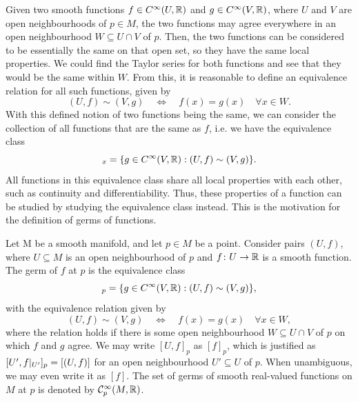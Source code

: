 \documentclass[a4paper,12pt]{article}
\begin{document}
Given two smooth functions $f \in C^\infty(U, \mathbb{R})$ and $g \in C^\infty(V, \mathbb{R})$, where $U$ and $V$ are open neighbourhoods of $p \in M$, the two functions may agree everywhere in an open neighbourhood $W \subseteq U \cap V$ of $p$.
Then, the two functions can be considered to be essentially the same on that open set, so they have the same local properties.
We could find the Taylor series for both functions and see that they would be the same within $W$.
From this, it is reasonable to define an equivalence relation for all such functions, given by
\begin{equation*}
    (U, f) \sim (V, g) \quad \iff \quad f(x) = g(x) \quad \forall x \in W.
\end{equation*}
With this defined notion of two functions being the same, we can consider the collection of all functions that are the same as $f$, i.e. we have the equivalence class
\begin{equation*}
    [(U, f)]_x = \{g \in C^\infty(V, \R) : (U, f) \sim (V, g)\}.
\end{equation*}
All functions in this equivalence class share all local properties with each other, such as continuity and differentiability.
Thus, these properties of a function can be studied by studying the equivalence class instead.
This is the motivation for the definition of germs of functions.
\begin{definition}\label{def:germ_of_smooth_function}
    Let M be a smooth manifold, and let $p \in M$ be a point.
    Consider pairs $(U, f)$, where $U \subseteq M$ is an open neighbourhood of $p$ and $f \colon U \to \mathbb{R}$ is a smooth function.
    The germ of $f$ at $p$ is the equivalence class
    \begin{equation}
    [(U, f)]_p = \{g \in C^\infty(V, \R) : (U, f) \sim (V, g)\},
    \end{equation}
    with the equivalence relation given by
    \begin{equation}
    (U, f) \sim (V, g) \quad \iff \quad f(x) = g(x) \quad \forall x \in W,
    \end{equation}
    where the relation holds if there is some open neighbourhood $W \subseteq U \cap V$ of $p$ on which $f$ and $g$ agree.
    We may write $[U, f]_p$ as $[f]_p$, which is justified as $[U', \eval*{f}{U'}]_p = [(U, f)]$ for an open neighbourhood $U' \subseteq U$ of $p$.
    When unambiguous, we may even write it as $[f]$.
    The set of germs of smooth real-valued functions on $M$ at $p$ is denoted by $\mathcal{C}^\infty_p(M, \mathbb{R})$.
\end{definition}
\end{document}

